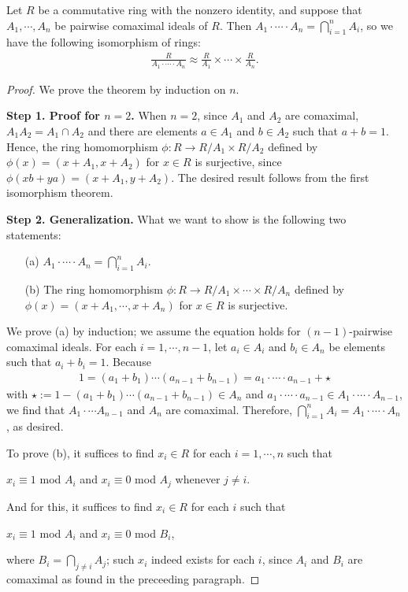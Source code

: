 \begin{thm}
    Let $R$ be a commutative ring with the nonzero identity, and suppose that $A_1, \cdots, A_n$ be pairwise comaximal ideals of $R$.
    Then $A_1\cdot\cdots\cdot A_n=\bigcap_{i=1}^n A_i$, so we have the following isomorphism of rings:
    \begin{align*}
        \frac{R}{A_1\cdot\cdots\cdot A_n} \approx \frac{R}{A_1}\times\cdots\times\frac{R}{A_n}.
    \end{align*}
\end{thm}
\begin{proof}
    We prove the theorem by induction on $n$.
    
    \textbf{Step 1. Proof for $n=2$.}\newline
    When $n=2$, since $A_1$ and $A_2$ are comaximal, $A_1A_2=A_1\cap A_2$ and there are elements $a\in A_1$ and $b\in A_2$ such that $a+b=1$.
    Hence, the ring homomorphism $\phi: R\rightarrow R/A_1\times R/A_2$ defined by $\phi(x)=(x+A_1, x+A_2)$ for $x\in R$ is surjective, since $\phi(xb+ya)=(x+A_1, y+A_2)$.
    The desired result follows from the first isomorphism theorem.

    \textbf{Step 2. Generalization.}\newline
    What we want to show is the following two statements:
    \begin{enumerate}
        \item[(a)]
        {
            $A_1\cdot\cdots\cdot A_n=\bigcap_{i=1}^n A_i$.
        }
        \item[(b)]
        {
            The ring homomorphism $\phi: R\rightarrow R/A_1\times\cdots\times R/A_n$ defined by $\phi(x)=(x+A_1, \cdots, x+A_n)$ for $x\in R$ is surjective.
        }
    \end{enumerate}
    
    We prove (a) by induction; we assume the equation holds for $(n-1)$-pairwise comaximal ideals.
    For each $i=1, \cdots, n-1$, let $a_i\in A_i$ and $b_i\in A_n$ be elements such that $a_i+b_i=1$.
    Because
    \begin{align*}
        1=(a_1+b_1)\cdots(a_{n-1}+b_{n-1})=a_1\cdot\cdots\cdot a_{n-1}+\star
    \end{align*}
    with $\star:=1-(a_1+b_1)\cdots(a_{n-1}+b_{n-1})\in A_n$ and $a_1\cdot\cdots\cdot a_{n-1}\in A_1\cdot\cdots\cdot A_{n-1}$, we find that $A_1\cdot\cdots A_{n-1}$ and $A_n$ are comaximal.
    Therefore, $\bigcap_{i=1}^n A_i=A_1\cdot\cdots\cdot A_n$, as desired.

    To prove (b), it suffices to find $x_i\in R$ for each $i=1, \cdots, n$ such that
    \begin{center}
        $x_i\equiv 1$ mod $A_i$ and $x_i\equiv 0$ mod $A_j$ whenever $j\neq i$.
    \end{center}
    And for this, it suffices to find $x_i\in R$ for each $i$ such that
    \begin{center}
        $x_i\equiv 1$ mod $A_i$ and $x_i\equiv 0$ mod $B_i$,
    \end{center}
    where $B_i=\bigcap_{j\neq i} A_j$; such $x_i$ indeed exists for each $i$, since $A_i$ and $B_i$ are comaximal as found in the preceeding paragraph.
\end{proof}

